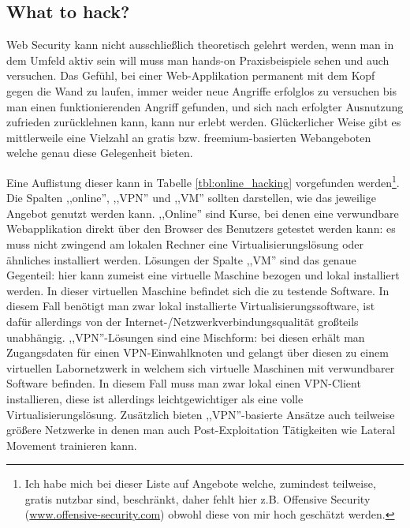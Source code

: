 \subsection{What to hack?}

Web Security kann nicht ausschließlich theoretisch gelehrt werden, wenn man in dem Umfeld aktiv sein will muss man hands-on Praxisbeispiele sehen und auch versuchen. Das Gefühl, bei einer Web-Applikation permanent mit dem Kopf gegen die Wand zu laufen, immer weider neue Angriffe erfolglos zu versuchen bis man einen funktionierenden Angriff gefunden, und sich nach erfolgter Ausnutzung zufrieden zurücklehnen kann, kann nur erlebt werden. Glückerlicher Weise gibt es mittlerweile eine Vielzahl an gratis bzw. freemium-basierten Webangeboten welche genau diese Gelegenheit bieten.

Eine Auflistung dieser kann in Tabelle \ref{tbl:online_hacking} vorgefunden werden\footnote{Ich habe mich bei dieser Liste auf Angebote welche, zumindest teilweise, gratis nutzbar sind, beschränkt, daher fehlt hier z.B. Offensive Security (\url{www.offensive-security.com}) obwohl diese von mir hoch geschätzt werden.}. Die Spalten ,,online'', ,,VPN'' und ,,VM'' sollten darstellen, wie das jeweilige Angebot genutzt werden kann. ,,Online'' sind Kurse, bei denen eine verwundbare Webapplikation direkt über den Browser des Benutzers getestet werden kann: es muss nicht zwingend am lokalen Rechner eine Virtualisierungslösung oder ähnliches installiert werden. Lösungen der Spalte ,,VM'' sind das genaue Gegenteil: hier kann zumeist eine virtuelle Maschine bezogen und lokal installiert werden. In dieser virtuellen Maschine befindet sich die zu testende Software. In diesem Fall benötigt man zwar lokal installierte Virtualisierungssoftware, ist dafür allerdings von der Internet-/Netzwerkverbindungsqualität großteils unabhängig. ,,VPN''-Lösungen sind eine Mischform: bei diesen erhält man Zugangsdaten für einen VPN-Einwahlknoten und gelangt über diesen zu einem virtuellen Labornetzwerk in welchem sich virtuelle Maschinen mit verwundbarer Software befinden. In diesem Fall muss man zwar lokal einen VPN-Client installieren, diese ist allerdings leichtgewichtiger als eine volle Virtualisierungslösung. Zusätzlich bieten ,,VPN''-basierte Ansätze auch teilweise größere Netzwerke in denen man auch Post-Exploitation Tätigkeiten wie Lateral Movement trainieren kann.

